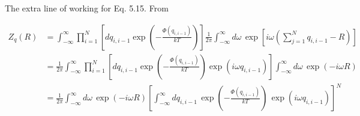 \documentclass[a4paper,12pt,titlepage]{report}
\begin{document}
The extra line of working for Eq. 5.15. From 

\begin{align}
Z_{q}\left(R\right) & =\int_{-\infty}^{\infty}\prod_{i=1}^{N}\left[dq_{i,i-1}\exp\left(-\frac{\Phi\left(q_{i,i-1}\right)}{kT}\right)\right]\frac{1}{2\pi}\int_{-\infty}^{\infty}d\omega\,\exp\left[i\omega\left(\sum_{j=1}^{N}q_{i,i-1}-R\right)\right]\nonumber\\
&=\frac{1}{2\pi}\int_{-\infty}^{\infty}\prod_{i=1}^{N}\left[dq_{i,i-1}\exp\left(-\frac{\Phi\left(q_{i,i-1}\right)}{kT}\right)\exp\left(i\omega q_{i,i-1}\right)\right]\int_{-\infty}^{\infty}d\omega\,\exp\left(-i\omega R\right)\nonumber\\
&=\frac{1}{2\pi}\int_{-\infty}^{\infty}d\omega\,\exp\left(-i\omega R\right)\left[\int_{-\infty}^{\infty}dq_{i,i-1}\,\exp\left(-\frac{\Phi\left(q_{i,i-1}\right)}{kT}\right)\,\exp\left(i\omega q_{i,i-1}\right)\right]^{N}\nonumber\label{FourierTransformPartitionFunction}
\end{align}
\end{document}
